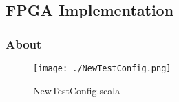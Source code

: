 
\subsection{FPGA Implementation}


\subsubsection{About}



\begin{figure}[H]
  \centering
  \texttt{[image: ./NewTestConfig.png]}
  \caption{NewTestConfig.scala}
  \label{fig:newtestconfig}
\end{figure}

